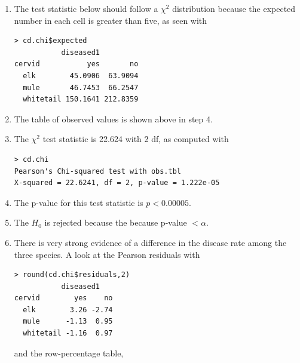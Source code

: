 \documentclass[10pt,openany]{book}\usepackage[]{graphicx}\usepackage[]{color}
\makeatletter
\newenvironment{kframe}{%
 \def\at@end@of@kframe{}%
 \ifinner\ifhmode%
  \def\at@end@of@kframe{\end{minipage}}%
  \begin{minipage}{\columnwidth}%
 \fi\fi%
 \def\FrameCommand##1{\hskip\@totalleftmargin \hskip-\fboxsep
 \colorbox{shadecolor}{##1}\hskip-\fboxsep
     \hskip-\linewidth \hskip-\@totalleftmargin \hskip\columnwidth}%
 \MakeFramed {\advance\hsize-\width
   \@totalleftmargin\z@ \linewidth\hsize
   \@setminipage}}%
 {\par\unskip\endMakeFramed%
 \at@end@of@kframe}
\newenvironment{knitrout}{}{} %
\makeatother
\begin{document}
\begin{itemize}
\begin{enumerate}
\begin{knitrout}
\begin{kframe}
\end{kframe}
\end{knitrout}
      \item The test statistic below should follow a $\chi^{2}$ distribution because the expected number in each cell is greater than five, as seen with
\begin{knitrout}
\color{fgcolor}\begin{kframe}
\begin{verbatim}
> cd.chi$expected
           diseased1
cervid           yes       no
  elk        45.0906  63.9094
  mule       46.7453  66.2547
  whitetail 150.1641 212.8359
\end{verbatim}
\end{kframe}
\end{knitrout}
      \item The table of observed values is shown above in step 4.
      \item The $\chi^{2}$ test statistic is 22.624 with 2 df, as computed with
\begin{knitrout}
\color{fgcolor}\begin{kframe}
\begin{verbatim}
> cd.chi
Pearson's Chi-squared test with obs.tbl 
X-squared = 22.6241, df = 2, p-value = 1.222e-05
\end{verbatim}
\end{kframe}
\end{knitrout}
      \item The p-value for this test statistic is $p<0.00005$.
      \item The $H_{0}$ is rejected because the because p-value $<\alpha$.
      \item There is very strong evidence of a difference in the disease rate among the three species.  A look at the Pearson residuals with
\begin{knitrout}
\color{fgcolor}\begin{kframe}
\begin{verbatim}
> round(cd.chi$residuals,2)
           diseased1
cervid        yes    no
  elk        3.26 -2.74
  mule      -1.13  0.95
  whitetail -1.16  0.97
\end{verbatim}
\end{kframe}
\end{knitrout}
and the row-percentage table,
\begin{knitrout}

\end{knitrout}
\end{enumerate}
\end{itemize}
\end{document}
